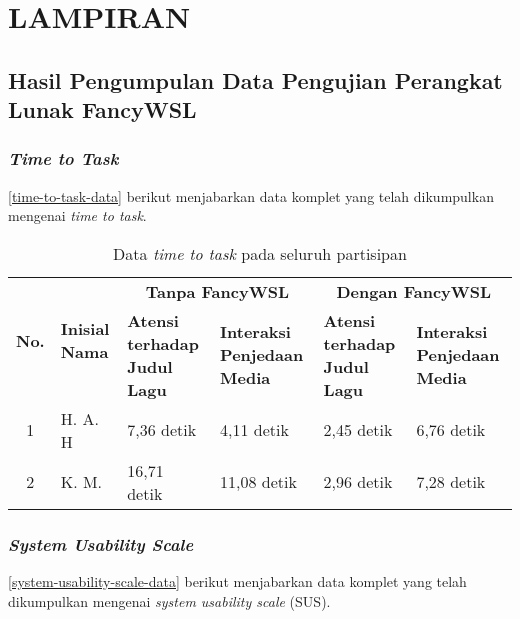 \chapter*{LAMPIRAN}

\section{Hasil Pengumpulan Data Pengujian Perangkat Lunak FancyWSL}

\subsection{\textit{Time to Task}}

\autoref{time-to-task-data} berikut menjabarkan data komplet yang telah dikumpulkan mengenai \textit{time to task}.

\begin{table}[h]
    \centering
    \caption{Data \textit{time to task} pada seluruh partisipan}
    \label{time-to-task-data}
    \begin{tabularx}{\linewidth}{|c|X|X|X|X|X|} \hline
        \multirow{2}{*}{\textbf{No.}} & \multirow{2}{*}{\textbf{Inisial Nama}} & \multicolumn{2}{c|}{\textbf{Tanpa FancyWSL}} & \multicolumn{2}{c|}{\textbf{Dengan FancyWSL}}\\ \cline{3-6}
        & & \textbf{Atensi terhadap Judul Lagu} & \textbf{Interaksi Penjedaan Media} & \textbf{Atensi terhadap Judul Lagu} & \textbf{Interaksi Penjedaan Media}\\ \hline
        1 & H. A. H & 7,36 detik & 4,11 detik & 2,45 detik & 6,76 detik\\ \hline
        2 & K. M. & 16,71 detik & 11,08 detik & 2,96 detik & 7,28 detik\\ \hline
    \end{tabularx}
\end{table}

\subsection{\textit{System Usability Scale}}

\autoref{system-usability-scale-data} berikut menjabarkan data komplet yang telah dikumpulkan mengenai \textit{system usability scale} (SUS).

